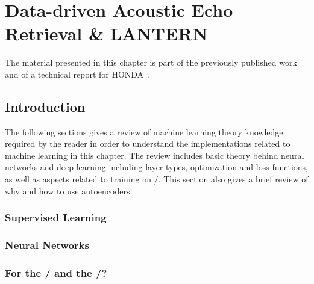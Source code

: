 \chapter{Data-driven Acoustic Echo Retrieval \& \acs{LANTERN}}\label{chap:lantern}

 \synopsisChLantern

\mynewline
The material presented in this chapter is part of the previously published work~\cite{di2019mirage} and of a technical report for HONDA\textregistered~.

\section{Introduction}
The following sections gives a review of machine learning theory knowledge required by the reader in order to understand the implementations related to machine learning in this chapter.
The review includes basic theory behind neural networks and deep learning including layer-types, optimization and loss functions, as well as aspects related to training on \RIRdef/.
This section also gives a brief review of why and how to use autoencoders.

\subsection{Supervised Learning}



\subsection{Neural Networks}


\subsection{For the \RIR/ and the \AER/?}


